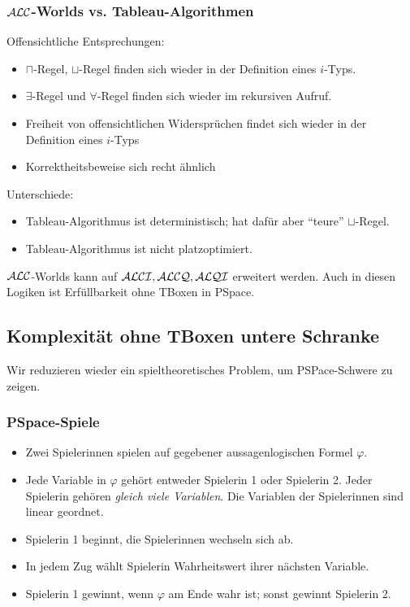 \subsubsection{\texorpdfstring{$\mathcal{A}\mathcal{L}\mathcal{C}$}{ALC}-Worlds vs. Tableau-Algorithmen}
Offensichtliche Entsprechungen:
\begin{itemize}
  \item $\sqcap$-Regel, $\sqcup$-Regel finden sich wieder in der Definition eines $i$-Typs.
  \item $\exists$-Regel und $\forall$-Regel finden sich wieder im rekursiven Aufruf.
  \item Freiheit von offensichtlichen Widersprüchen findet sich wieder in der Definition eines $i$-Typs
  \item Korrektheitsbeweise sich recht ähnlich
\end{itemize}

Unterschiede:

\begin{itemize}
    \item Tableau-Algorithmus ist deterministisch; hat dafür aber \enquote{teure} $\sqcup$-Regel.
    \item Tableau-Algorithmus ist nicht platzoptimiert.
\end{itemize}

$\mathcal{A}\mathcal{L}\mathcal{C}$-Worlds kann auf $\mathcal{A}\mathcal{L}\mathcal{C}\mathcal{I}, \mathcal{A}\mathcal{L}\mathcal{C}\mathcal{Q}, \mathcal{A}\mathcal{L}\mathcal{Q}\mathcal{I}$ erweitert werden. Auch in diesen Logiken ist Erfüllbarkeit ohne TBoxen in PSpace.

\subsection{Komplexität ohne TBoxen untere
Schranke}\label{komplexituxe4t-ohne-tboxen-untere-schranke}

Wir reduzieren wieder ein spieltheoretisches Problem, um PSPace-Schwere zu zeigen.


\subsubsection{PSpace-Spiele}

\begin{itemize}
    \item Zwei Spielerinnen spielen auf gegebener aussagenlogischen Formel $\varphi$.
    \item Jede Variable in $\varphi$ gehört entweder Spielerin 1 oder Spielerin 2. Jeder Spielerin gehören \emph{gleich viele Variablen}. Die Variablen der Spielerinnen sind linear geordnet.
    \item Spielerin 1 beginnt, die Spielerinnen wechseln sich ab.

    \item In jedem Zug wählt Spielerin Wahrheitswert ihrer nächsten Variable.

    \item Spielerin 1 gewinnt, wenn $\varphi$ am Ende wahr ist; sonst gewinnt Spielerin 2.
\end{itemize}

